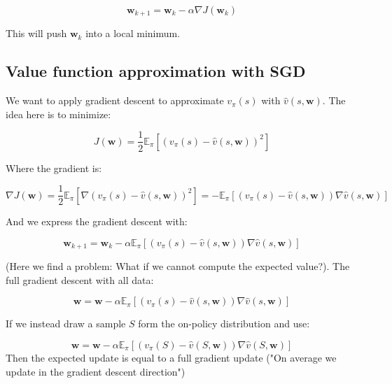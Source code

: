 	\begin{equation}
	 	\textbf{w}_{k+1} = \textbf{w}_k - \alpha \nabla J(\textbf{w}_k)
	 \end{equation} 

This will push $\textbf{w}_k$ into a local minimum. 

\subsection*{Value function approximation with SGD}
We want to apply gradient descent to approximate $v_\pi(s)$ with $\hat{v}(s,\textbf{w})$. The idea here is to minimize:

	\begin{equation}
		J(\textbf{w}) = \frac{1} {2} \mathbb{E}_\pi[(v_\pi(s) - \hat{v}(s,\textbf{w}))^{2}]
	\end{equation}

Where the gradient is:

	\begin{equation}
		\nabla J(\textbf{w}) = \frac{1} {2} \mathbb{E}_\pi[\nabla (v_\pi(s) - \hat{v}(s,\textbf{w}))^{2}]= - \mathbb{E}_\pi [(v_\pi(s) - \hat{v}(s, \textbf{w}))\nabla \hat{v}(s,\textbf{w})]
	\end{equation}

And we express the gradient descent with:

	\begin{equation}
		\textbf{w}_{k+1} = \textbf{w}_k - \alpha \mathbb{E}_\pi [(v_\pi(s) - \hat{v}(s, \textbf{w}))\nabla \hat{v}(s,\textbf{w})]
	\end{equation}

(Here we find a problem: What if we cannot compute the expected value?). The full gradient descent with all data:

	\begin{equation}
		\textbf{w} = \textbf{w} - \alpha \mathbb{E}_\pi [(v_\pi(s) - \hat{v}(s, \textbf{w}))\nabla \hat{v}(s,\textbf{w})]
	\end{equation}

If we instead draw a sample $S$ form the on-policy distribution and use:

	\begin{equation}
		\textbf{w} = \textbf{w} - \alpha \mathbb{E}_\pi [(v_\pi(S) - \hat{v}(S, \textbf{w}))\nabla \hat{v}(S,\textbf{w})]
	\end{equation}
Then the expected update is equal to a full gradient update ("On average we update in the gradient descent direction")


